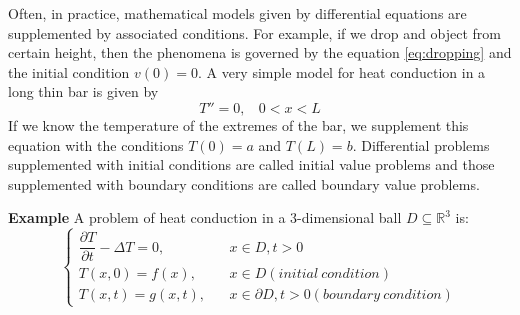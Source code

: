 \documentclass[main.tex]{subfiles}
\begin{document}
\par Often, in practice, mathematical models given by differential equations are supplemented by associated conditions. For example, if we drop and object from certain height, then the phenomena is governed by the equation \eqref{eq:dropping} and the initial condition $v(0) = 0$. A very simple model for heat conduction in a long thin bar is given by 
\begin{equation}
    T'' = 0, \ \ \ \ 0 < x < L
\end{equation}
If we know the temperature of the extremes of the bar, we supplement this equation with the conditions $T(0) = a$ and $T(L) = b$. Differential problems supplemented with initial conditions are called initial value problems and those supplemented with boundary conditions are called boundary value problems. 
\par \noindent \textbf{Example} A problem of heat conduction in a 3-dimensional ball $D \subseteq \mathbb{R}^3$ is: 
\begin{equation}
    \begin{cases}
        \dfrac{\partial T}{\partial t} - \Delta T = 0, \ \ \ \ &x \in D, t > 0 \\
        T(x,0) = f(x), \ \ \ \ &x \in D (initial\ condition)\\
        T(x,t) = g(x,t), \ \ \ \ &x \in \partial D, t > 0 (boundary\ condition)
    \end{cases}
\end{equation}
\end{document}
